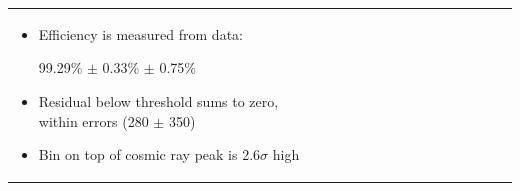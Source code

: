 \documentclass[landscape]{article}
\begin{document}
\begin{tabular}{p{0.6\linewidth} p{0.4\linewidth}}
\begin{minipage}{1.1\linewidth}
    \begin{itemize}

      \item Efficiency is measured from data:
\begin{center} 99.29\% $\pm$ 0.33\% $\pm$ 0.75\% \end{center}

\vspace{1 cm}
      \item Residual below threshold sums to zero, within errors (280
      $\pm$ 350)

\vspace{1 cm}
      \item Bin on top of cosmic ray peak is 2.6$\sigma$ high

    \end{itemize}

  \end{minipage} \\
\end{tabular}
\end{document}
